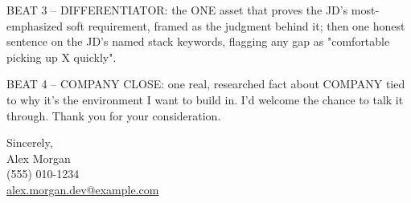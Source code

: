 \documentclass[letterpaper,11pt]{article}
\begin{document}
{{BEAT 3 -- DIFFERENTIATOR: the ONE asset that proves the JD's most-emphasized soft requirement,
framed as the judgment behind it; then one honest sentence on the JD's named stack keywords,
flagging any gap as "comfortable picking up X quickly".}}

{{BEAT 4 -- COMPANY CLOSE: one real, researched fact about COMPANY tied to why it's the
environment I want to build in.}} I'd welcome the chance to talk it through. Thank you for your
consideration.

\vspace{0.5cm}
\raggedright
Sincerely, \\ Alex Morgan \\ (555) 010-1234 \\ \href{mailto:alex.morgan.dev@example.com}{alex.morgan.dev@example.com}
\end{document}
